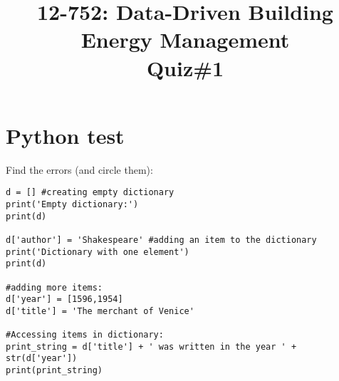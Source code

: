 \documentclass[times, 12pt, singlecolumn]{article}
\title{12-752: Data-Driven Building Energy Management\\ Quiz\#1}
\begin{document}
\maketitle

\section{Python test}

Find the errors (and circle them):

\begin{verbatim}
d = [] #creating empty dictionary
print('Empty dictionary:')
print(d)

d['author'] = 'Shakespeare' #adding an item to the dictionary
print('Dictionary with one element')
print(d)

#adding more items:
d['year'] = [1596,1954]
d['title'] = 'The merchant of Venice'

#Accessing items in dictionary:
print_string = d['title'] + ' was written in the year ' + str(d['year'])
print(print_string)
\end{verbatim}
\end{document}
